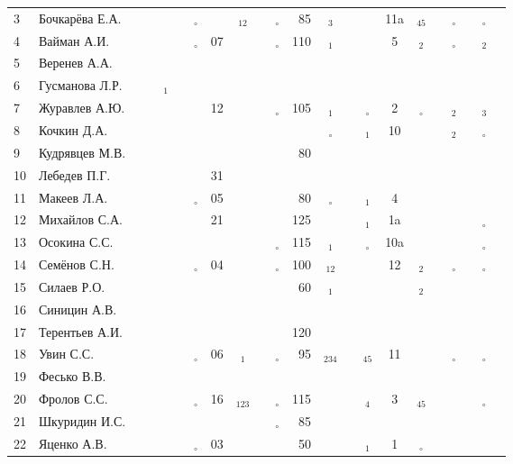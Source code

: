 \documentclass[a4paper,landscape,11pt]{article}
\newcommand*\OK{&\small \ding{51}$\!\!_\circ$} %
\newcommand*\Ok{&\small \ding{51}$\!\!_\circ$} %
\newcommand*\ok{&{\small \ding{51}}} %
\newcommand*\no{&{\small }} %
\newcommand*\da{&{\small\ding{48}$\!\!_1$}} %
\newcommand*\dab{&{\small\ding{48}$\!\!_{12}$}} %
\newcommand*\ab{&{\small\ding{48}$\!\!_{12}$}} %
\newcommand*\dabc{&{\small\ding{48}$\!\!_{123}$}} %
\newcommand*\db{&{\small\ding{48}$\!\!_2$}} %
\newcommand*\dc{&{\small\ding{48}$\!\!_3$}} %
\newcommand*\dd{&{\small\ding{48}$\!\!_4$}} %
\newcommand*\bd{&{\small\ding{48}$\!\!_{234}$}} %
\newcommand*\de{&{\small\ding{48}$\!\!_{45}$}} %
\begin{document}
\begin{tabular}{l|l|cccccccccrcccccccccc}
 3&Бочкарёва Е.А.  \ok\ok\ok\ok\OK\ok\dab \ok\OK& 85\dc\no\ok&11a\de\ok\Ok\ok\Ok\no\\
 4&Вайман А.И.     \no\no\no\ok\OK&07\ok  \ok\OK&110\da\ok\ok&  5\db\ok\Ok\ok\db&  \\
 5&Веренев А.А.    \no\no\no\no\ok\no\no  \ok\ok \no\no\no\no \no\ok\no\no\no\no&  \\
 6&Гусманова Л.Р.  \ok\ok\da\ok\no\no\no  \no\no \no\no\no\no \no\no\no\no\no\no\no\\
 7&Журавлев А.Ю.   \no\no\no\no\ok&12\ok  \ok\OK&105\da\ok\Ok&  2\Ok\ok\db\ok\dc&  \\
 8&Кочкин Д.А.     \no\no\no\no\ok\ok\no  \ok\no \no\Ok\no\da& 10\no\no\db\ok\Ok\ok\\
 9&Кудрявцев М.В.  \no\no\ok\ok\no\no\no  \ok\ok& 80\ok\ok\no \no\no\no\no\no\no&  \\
10&Лебедев П.Г.    \ok\ok\no\ok\ok&31\no  \ok\no \no\no\no\no \no\no\ok\ok\ok\no&  \\
11&Макеев Л.А.     \ok\ok\ok\ok\OK&05\ok  \ok\ok& 80\Ok\ok\da&  4\ok\ok\ok\ok\no\ok\\
\midrule
12&Михайлов С.А.   \no\no\ok\ok\ok&21\no  \ok\ok&125\ok\ok\da& 1a\ok\ok\ok\ok\Ok\ok\\
13&Осокина С.С.    \ok\ok\ok\ok\no\no\ok  \ok\OK&115\da\no\Ok&10a\ok\no\ok\no\Ok\no\\
14&Семёнов С.Н.    \ok\ok\ok\ok\OK&04\ok  \ok\OK&100\ab\ok\ok& 12\db\no\Ok\ok\Ok&  \\
15&Силаев Р.О.     \ok\ok\no\no\no\no\no  \no\ok& 60\da\ok\no \no\db\no\ok\no\no&  \\
16&Синицин А.В.    \ok\ok\no\ok\no\no\no  \no\no \no\no\no\no \no\no\no\no\no\no&  \\
17&Терентьев А.И.  \ok\ok\ok\ok\no\no\no  \no\ok&120\no\no\no \no\no\no\no\no\no&  \\
18&Увин С.С.       \ok\ok\ok\ok\OK&06\da  \ok\OK& 95\bd\ok\de& 11\ok\ok\Ok\ok\Ok\ok\\
19&Фесько В.В.     \no\no\no\no\no\no\no  \no\no \no\no\no\no \no\no\no\no\no\no&  \\
20&Фролов С.С.     \ok\ok\ok\ok\OK&16\dabc\ok\OK&115\ok\ok\dd&  3\de\ok\ok\ok\Ok&  \\ 
21&Шкуридин И.С.   \ok\ok\ok\ok\ok\no\ok  \ok\OK& 85\ok\ok\no \no\ok\no\no\no\no&  \\
22&Яценко А.В.     \ok\ok\ok\ok\OK&03\ok  \ok\ok& 50\ok\ok\da&  1\Ok\no\no\no\no\ok\\ 
\bottomrule
\end{tabular} 
\newpage
\end{document}
